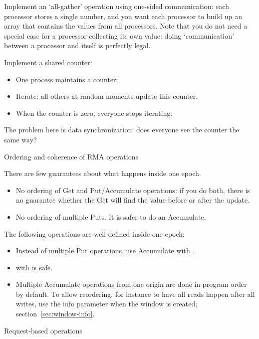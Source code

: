 \begin{exercise}
  Implement an `all-gather' operation using one-sided communication:
  each processor stores a single number, and you want each processor
  to build up an array that contains the values from all
  processors. Note that you do not need a special case for a processor
  collecting its own value: doing `communication' between a processor
  and itself is perfectly legal.
\end{exercise}

\begin{exercise}
  \label{ex:countdown}

  Implement a shared counter:
  \begin{itemize}
  \item One process maintains a counter;
  \item Iterate: all others at random moments update this counter.
  \item When the counter is zero, everyone stops iterating.
  \end{itemize}
  The problem here is data synchronization: does everyone see the
  counter the same way?
\end{exercise}

 {Ordering and coherence of RMA operations}

There are few guarantees about what happens inside one epoch.
\begin{itemize}
\item No ordering of Get and Put/Accumulate operations: if you do
  both, there is no guarantee whether the Get will find the value
  before or after the update.
\item No ordering of multiple Puts. It is safer to do an Accumulate.
\end{itemize}
The following operations are well-defined inside one epoch:
\begin{itemize}
\item Instead of multiple Put operations, use Accumulate with
  .
\item {} with
   is safe.
\item Multiple Accumulate operations from one origin are done in
  program order by default. To allow reordering, for instance to have
  all reads happen after all writes, use the info parameter
  when the window is created; section~\ref{sec:window-info}.
\end{itemize}

 {Request-based operations}

